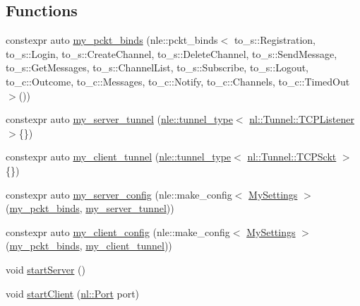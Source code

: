 \subsection*{Functions}
\begin{DoxyCompactItemize}
\item 
constexpr auto \hyperlink{namespaceexample_ac2cef3a58375e350f325130a9ed9e346}{my\+\_\+pckt\+\_\+binds} (nle\+::pckt\+\_\+binds$<$ to\+\_\+s\+::\+Registration, to\+\_\+s\+::\+Login, to\+\_\+s\+::\+Create\+Channel, to\+\_\+s\+::\+Delete\+Channel, to\+\_\+s\+::\+Send\+Message, to\+\_\+s\+::\+Get\+Messages, to\+\_\+s\+::\+Channel\+List, to\+\_\+s\+::\+Subscribe, to\+\_\+s\+::\+Logout, to\+\_\+c\+::\+Outcome, to\+\_\+c\+::\+Messages, to\+\_\+c\+::\+Notify, to\+\_\+c\+::\+Channels, to\+\_\+c\+::\+Timed\+Out $>$())
\item 
constexpr auto \hyperlink{namespaceexample_a86eab8c8648c370d8dbf00cf2f841fd9}{my\+\_\+server\+\_\+tunnel} (\hyperlink{structexperiment_1_1tunnel__type}{nle\+::tunnel\+\_\+type}$<$ \hyperlink{classnl_1_1Tunnel_1_1TCPListener}{nl\+::\+Tunnel\+::\+T\+C\+P\+Listener} $>$\{\})
\item 
constexpr auto \hyperlink{namespaceexample_a0c17778857fd8a16e970c1fcf2050f02}{my\+\_\+client\+\_\+tunnel} (\hyperlink{structexperiment_1_1tunnel__type}{nle\+::tunnel\+\_\+type}$<$ \hyperlink{classnl_1_1Tunnel_1_1TCPSckt}{nl\+::\+Tunnel\+::\+T\+C\+P\+Sckt} $>$\{\})
\item 
constexpr auto \hyperlink{namespaceexample_ac04453c909e716e9769692290761b844}{my\+\_\+server\+\_\+config} (nle\+::make\+\_\+config$<$ \hyperlink{namespaceexample_a5efa1dbb95bf11993a49738e533e7d0a}{My\+Settings} $>$(\hyperlink{namespaceexample_ac2cef3a58375e350f325130a9ed9e346}{my\+\_\+pckt\+\_\+binds}, \hyperlink{namespaceexample_a86eab8c8648c370d8dbf00cf2f841fd9}{my\+\_\+server\+\_\+tunnel}))
\item 
constexpr auto \hyperlink{namespaceexample_a2e75dd524031f59d04a53e5073228ac0}{my\+\_\+client\+\_\+config} (nle\+::make\+\_\+config$<$ \hyperlink{namespaceexample_a5efa1dbb95bf11993a49738e533e7d0a}{My\+Settings} $>$(\hyperlink{namespaceexample_ac2cef3a58375e350f325130a9ed9e346}{my\+\_\+pckt\+\_\+binds}, \hyperlink{namespaceexample_a0c17778857fd8a16e970c1fcf2050f02}{my\+\_\+client\+\_\+tunnel}))
\item 
void \hyperlink{namespaceexample_ab71cf8c7d29ccb4a44b67da2d34aa00d}{start\+Server} ()
\item 
void \hyperlink{namespaceexample_ad4a8834efe793f3decd11753886aedc9}{start\+Client} (\hyperlink{namespacenl_a12899c87e239db66809da0a71fcc9129}{nl\+::\+Port} port)
\end{DoxyCompactItemize}


